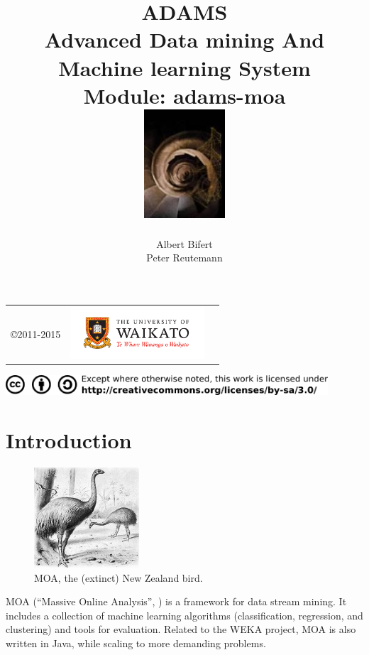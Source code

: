 \documentclass[a4paper]{book}
\title{
  \textbf{ADAMS} \\
  {\Large \textbf{A}dvanced \textbf{D}ata mining \textbf{A}nd \textbf{M}achine
  learning \textbf{S}ystem} \\
  {\Large Module: adams-moa} \\
  \vspace{1cm}
  \includegraphics[width=3cm]{images/moa_logo.png} \\
}
\author{
  Albert Bifert \\
  Peter Reutemann
}
\begin{document}
\begin{titlepage}
\maketitle

\thispagestyle{empty}
\center
\begin{table}[b]
	\begin{tabular}{c l l}
		\parbox[c][2cm]{2cm}{\copyright 2011-2015} &
		\parbox[c][2cm]{5cm}{\includegraphics[width=5cm]{images/coat_of_arms.pdf}} \\
	\end{tabular}
	\includegraphics[width=12cm]{images/cc.png} \\
\end{table}

\end{titlepage}

\tableofcontents
\listoffigures

\chapter{Introduction}

\begin{figure}
  \vspace{-20pt}
  \centering
  \includegraphics[width=0.35\textwidth]{images/moa-bird.png}
  \caption{MOA, the (extinct) New Zealand bird.}
  \label{moa-bird}
\end{figure}  

MOA (``Massive Online Analysis'', \cite{moa}) is a framework for data stream mining. It 
includes a collection of machine learning algorithms (classification, 
regression, and clustering) and tools for evaluation. Related to the WEKA 
project, MOA is also written in Java, while scaling to more demanding problems.
\end{document}
